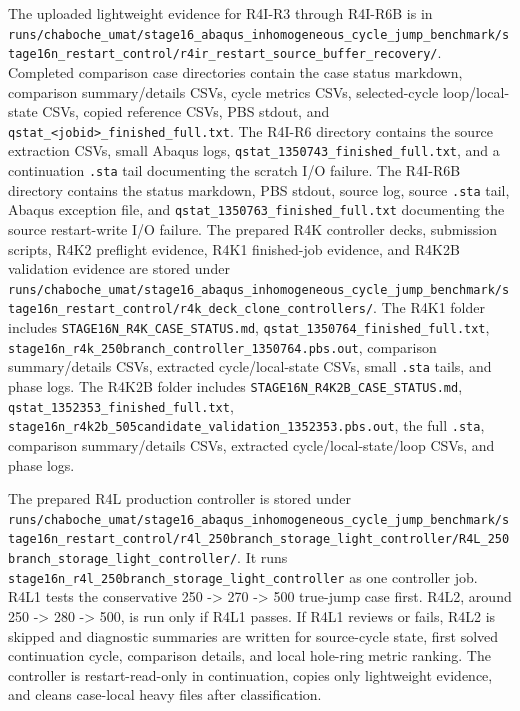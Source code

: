 \documentclass[11pt,a4paper]{article}
\newcommand{\code}[1]{\texttt{#1}}
\begin{document}
The uploaded lightweight evidence for R4I-R3 through R4I-R6B is in \code{runs/chaboche\_umat/stage16\_abaqus\_inhomogeneous\_cycle\_jump\_benchmark/stage16n\_restart\_control/r4ir\_restart\_source\_buffer\_recovery/}. Completed comparison case directories contain the case status markdown, comparison summary/details CSVs, cycle metrics CSVs, selected-cycle loop/local-state CSVs, copied reference CSVs, PBS stdout, and \code{qstat\_<jobid>\_finished\_full.txt}. The R4I-R6 directory contains the source extraction CSVs, small Abaqus logs, \code{qstat\_1350743\_finished\_full.txt}, and a continuation \code{.sta} tail documenting the scratch I/O failure. The R4I-R6B directory contains the status markdown, PBS stdout, source log, source \code{.sta} tail, Abaqus exception file, and \code{qstat\_1350763\_finished\_full.txt} documenting the source restart-write I/O failure. The prepared R4K controller decks, submission scripts, R4K2 preflight evidence, R4K1 finished-job evidence, and R4K2B validation evidence are stored under \code{runs/chaboche\_umat/stage16\_abaqus\_inhomogeneous\_cycle\_jump\_benchmark/stage16n\_restart\_control/r4k\_deck\_clone\_controllers/}. The R4K1 folder includes \code{STAGE16N\_R4K\_CASE\_STATUS.md}, \code{qstat\_1350764\_finished\_full.txt}, \code{stage16n\_r4k\_250branch\_controller\_1350764.pbs.out}, comparison summary/details CSVs, extracted cycle/local-state CSVs, small \code{.sta} tails, and phase logs. The R4K2B folder includes \code{STAGE16N\_R4K2B\_CASE\_STATUS.md}, \code{qstat\_1352353\_finished\_full.txt}, \code{stage16n\_r4k2b\_505candidate\_validation\_1352353.pbs.out}, the full \code{.sta}, comparison summary/details CSVs, extracted cycle/local-state/loop CSVs, and phase logs.

The prepared R4L production controller is stored under \code{runs/chaboche\_umat/stage16\_abaqus\_inhomogeneous\_cycle\_jump\_benchmark/stage16n\_restart\_control/r4l\_250branch\_storage\_light\_controller/R4L\_250branch\_storage\_light\_controller/}. It runs \code{stage16n\_r4l\_250branch\_storage\_light\_controller} as one controller job. R4L1 tests the conservative 250 -> 270 -> 500 true-jump case first. R4L2, around 250 -> 280 -> 500, is run only if R4L1 passes. If R4L1 reviews or fails, R4L2 is skipped and diagnostic summaries are written for source-cycle state, first solved continuation cycle, comparison details, and local hole-ring metric ranking. The controller is restart-read-only in continuation, copies only lightweight evidence, and cleans case-local heavy files after classification.
\end{document}
